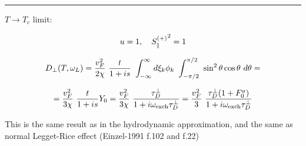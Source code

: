 \documentclass[a4paper]{article}
\begin{document}
\hrule\medskip

$T\rightarrow T_c$ limit:

$$
u=1,\quad
{\sp} = 1
$$

$$
D_\perp (T, \ol) =
  \frac{v_F^2}{2\chi}
  \ \frac{t}{1+is}
  \ \int_{-\infty}^{\infty}
  d\xi_k\phi_k
  \ \int_{-\pi/2}^{\pi/2}
  \  \sin^2\theta \cos\theta \ d\theta =
$$

$$
  = \frac{v_F^2}{3\chi} \ \frac{t}{1+is} Y_0
  = \frac{v_F^2}{3\chi} \ \frac{\tdp}{1+i\oe\tdp}
  = \frac{v_F^2}{3}\ \frac{\tdp (1+F_0^a)}{1+i\oe\tdp}
$$

This is the same result as in the hydrodynamic approximation,
and the same as normal Legget-Rice effect (Einzel-1991 f.102 and f.22)
\end{document}

